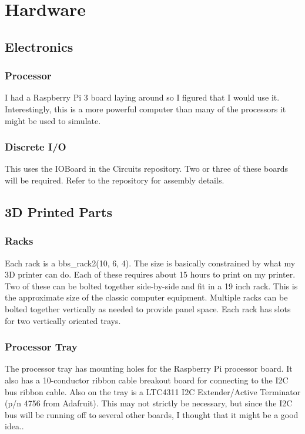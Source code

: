 \documentclass[10pt, openany]{book}
\begin{document}
\chapter{Hardware}

\section{Electronics}
\subsection{Processor}
I had a Raspberry Pi 3 board laying around so I figured that I would use it.  Interestingly, this is a more powerful computer than many of the processors it might be used to simulate.

\subsection{Discrete I/O}
This uses the IOBoard in the Circuits repository.  Two or three of these boards will be required.  Refer to the repository for assembly details.

\section{3D Printed Parts}
\subsection{Racks}
Each rack is a bbs\_rack2(10, 6, 4).  The size is basically constrained by what my 3D printer can do.  Each of these requires about 15 hours to print on my printer.  Two of these can be bolted together side-by-side and fit in a 19 inch rack.  This is the approximate size of the classic computer equipment.  Multiple racks can be bolted together vertically as needed to provide panel space.  Each rack has slots for two vertically oriented trays.

\subsection{Processor Tray}
 The processor tray has mounting holes for the Raspberry Pi processor board. It also has a 10-conductor ribbon cable breakout board for connecting to the I2C bus ribbon cable.  Also on the tray is a LTC4311 I2C Extender/Active Terminator (p/n 4756 from Adafruit).  This may not strictly be necessary, but since the I2C bus will be running off to several other boards, I thought that it might be a good idea..
\end{document}
